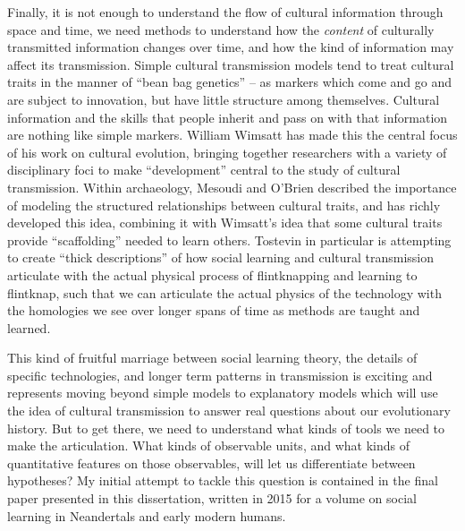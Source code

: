 Finally, it is not enough to understand the flow of cultural information through space and time, we need methods to understand how the \emph{content} of culturally transmitted information changes over time, and how the kind of information may affect its transmission.  Simple cultural transmission models tend to treat cultural traits in the manner of ``bean bag genetics'' -- as markers which come and go and are subject to innovation, but have little structure among themselves.  Cultural information and the skills that people inherit and pass on with that information are nothing like simple markers.  William Wimsatt \citep{wimsatt2007reproducing,wimsatt2013articulating,Wimsatt2014,wimsatt2019articulating} has made this the central focus of his work on cultural evolution, bringing together researchers with a variety of disciplinary foci to make ``development'' central to the study of cultural transmission.  Within archaeology, Mesoudi and O'Brien \citep{mesoudi2008learning} described the importance of modeling the structured relationships between cultural traits, and \citet{tostevin2019content} has richly developed this idea, combining it with Wimsatt's idea that some cultural traits provide ``scaffolding'' needed to learn others.  Tostevin in particular is attempting to create ``thick descriptions'' of how social learning and cultural transmission articulate with the actual physical process of flintknapping and learning to flintknap, such that we can articulate the actual physics of the technology with the homologies we see over longer spans of time as methods are taught and learned.  

This kind of fruitful marriage between social learning theory, the details of specific technologies, and longer term patterns in transmission is exciting and represents moving beyond simple models to explanatory models which will use the idea of cultural transmission to answer real questions about our evolutionary history.  But to get there, we need to understand what kinds of tools we need to make the articulation.  What kinds of observable units, and what kinds of quantitative features on those observables, will let us differentiate between hypotheses?  My initial attempt to tackle this question is contained in the final paper presented in this dissertation, written in 2015 for a volume on social learning in Neandertals and early modern humans.  

